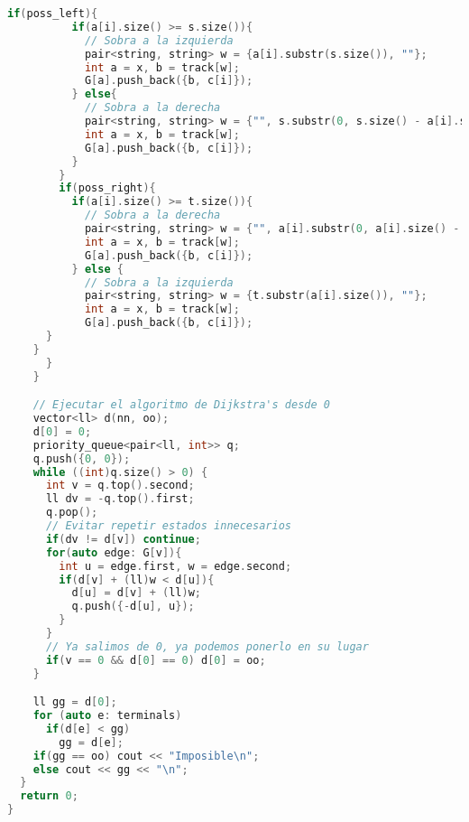 \begin{lstlisting}[language=C++]
        if(poss_left){
          if(a[i].size() >= s.size()){
            // Sobra a la izquierda
            pair<string, string> w = {a[i].substr(s.size()), ""};
            int a = x, b = track[w];
            G[a].push_back({b, c[i]});
          } else{
            // Sobra a la derecha
            pair<string, string> w = {"", s.substr(0, s.size() - a[i].size())};
            int a = x, b = track[w];
            G[a].push_back({b, c[i]});
          }
        }
        if(poss_right){
          if(a[i].size() >= t.size()){
            // Sobra a la derecha
            pair<string, string> w = {"", a[i].substr(0, a[i].size() - t.size())};
            int a = x, b = track[w];
            G[a].push_back({b, c[i]});
          } else {
            // Sobra a la izquierda
            pair<string, string> w = {t.substr(a[i].size()), ""};
            int a = x, b = track[w];
            G[a].push_back({b, c[i]});
	  }
	}
      }
    }

    // Ejecutar el algoritmo de Dijkstra's desde 0
    vector<ll> d(nn, oo);
    d[0] = 0;
    priority_queue<pair<ll, int>> q;
    q.push({0, 0});
    while ((int)q.size() > 0) {
      int v = q.top().second;
      ll dv = -q.top().first;
      q.pop();
      // Evitar repetir estados innecesarios
      if(dv != d[v]) continue;
      for(auto edge: G[v]){
        int u = edge.first, w = edge.second;
        if(d[v] + (ll)w < d[u]){
          d[u] = d[v] + (ll)w;
          q.push({-d[u], u});
        }
      }
      // Ya salimos de 0, ya podemos ponerlo en su lugar
      if(v == 0 && d[0] == 0) d[0] = oo;
    }

    ll gg = d[0];
    for (auto e: terminals)
      if(d[e] < gg)
        gg = d[e];
    if(gg == oo) cout << "Imposible\n";
    else cout << gg << "\n";
  }
  return 0;
}
\end{lstlisting}

\newpage

